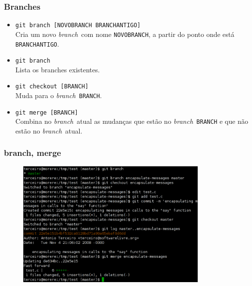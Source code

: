 \documentclass{beamer}
\newcommand{\branch}{\emph{branch}}
\begin{document}
\begin{frame}
  \frametitle{Branches}
  \begin{itemize}
    \item \texttt{git branch [NOVOBRANCH BRANCHANTIGO]}\\
      Cria um novo \branch\ com nome \texttt{NOVOBRANCH}, a partir do
      ponto onde está \texttt{BRANCHANTIGO}.
      \pause

    \item \texttt{git branch}\\
      Lista os branches existentes.
      \pause

    \item \texttt{git checkout [BRANCH]}\\
      Muda para o \branch\ \texttt{BRANCH}.
      \pause

    \item \texttt{git merge [BRANCH]}\\
      Combina no \branch\ atual as mudanças que estão no \branch\ 
      \texttt{BRANCH} e que não estão no \branch\ atual.
  \end{itemize}
\end{frame}

\begin{frame}
  \frametitle{branch, merge}
  \begin{figure}[h]
    \begin{center}
      \includegraphics[width=0.85\textwidth]{figs/git-screenshot-branch-merge.pdf}
    \end{center}
    \label{fig:git-branch-merge-screenshot}
  \end{figure}
\end{frame}
\end{document}

